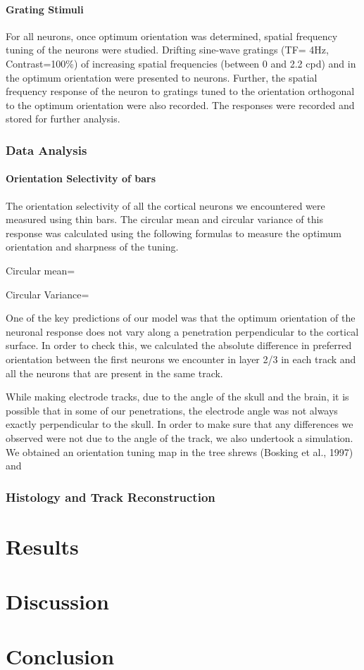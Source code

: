 \paragraph{Grating Stimuli}
For all neurons, once optimum orientation was determined, spatial frequency tuning of the neurons were studied. Drifting sine-wave gratings (TF= 4Hz, Contrast=100\%) of increasing spatial frequencies (between 0 and 2.2 cpd) and in the optimum orientation were presented to neurons. Further, the spatial frequency response of the neuron to gratings tuned to the orientation orthogonal to the optimum orientation were also recorded. The responses were recorded and stored for further analysis.

\subsubsection{Data Analysis}

\paragraph{Orientation Selectivity of bars}

The orientation selectivity of all the cortical neurons we encountered were measured using thin bars. The circular mean and circular variance of this response was calculated using the following formulas to measure the optimum orientation and sharpness of the tuning.

Circular mean=

Circular Variance=

One of the key predictions of our model was that the optimum orientation of the neuronal response does not vary along a penetration perpendicular to the cortical surface. In order to check this, we calculated the absolute difference in preferred orientation between the first neurons we encounter in layer 2/3 in each track and all the neurons that are present in the same track.

While making electrode tracks, due to the angle of the skull and the brain, it is possible that in some of our penetrations, the electrode angle was not always exactly perpendicular to the skull. In order to make sure that any differences we observed were not due to the angle of the track, we also undertook a simulation. We obtained an orientation tuning map in the tree shrews (Bosking et al., 1997) and 
\subsubsection{Histology and Track Reconstruction}


\section{Results}


\section{Discussion}
\section{Conclusion}